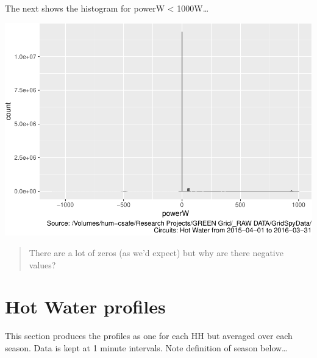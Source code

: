 \documentclass[]{article}
\begin{document}
The next shows the histogram for powerW \textless{} 1000W\ldots{}

\includegraphics{nzGGHouseholdPowerDemandProfile_Hot Water_2015-04-01_2016-03-31_files/figure-latex/histo power under 1000-1.pdf}

\begin{quote}
There are a lot of zeros (as we'd expect) but why are there negative
values?
\end{quote}

\section{Hot Water profiles}\label{hot-water-profiles}

This section produces the profiles as one for each HH but averaged over
each season. Data is kept at 1 minute intervals. Note definition of
season below\ldots{}
\end{document}
